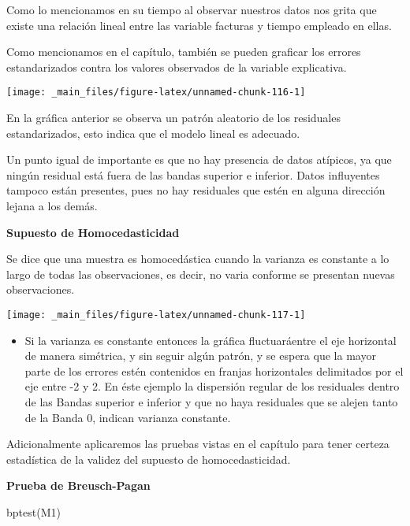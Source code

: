 \documentclass[
  a4paper,
  oneside,
  openany]{book}
\newenvironment{Shaded}{\begin{snugshade}}{\end{snugshade}}
\newcommand{\FunctionTok}[1]{\textcolor[rgb]{0.00,0.00,0.00}{#1}}
\newcommand{\NormalTok}[1]{#1}
\providecommand{\tightlist}{%
  \setlength{\itemsep}{0pt}\setlength{\parskip}{0pt}}
\begin{document}
Como lo mencionamos en su tiempo al observar nuestros datos nos grita que existe una relación lineal entre las variable facturas y tiempo empleado en ellas.

Como mencionamos en el capítulo, también se pueden graficar los errores estandarizados contra los valores observados de la variable explicativa.

\begin{center}\texttt{[image: \_main\_files/figure-latex/unnamed-chunk-116-1]} \end{center}

En la gráfica anterior se observa un patrón aleatorio de los residuales estandarizados, esto indica que el modelo lineal es adecuado.

Un punto igual de importante es que no hay presencia de datos atípicos, ya que ningún residual está fuera de las bandas superior e inferior. Datos influyentes tampoco están presentes, pues no hay residuales que estén en alguna dirección lejana a los demás.

\textbf{Supuesto de Homocedasticidad}

Se dice que una muestra es homocedástica cuando la varianza es constante a lo largo de todas las observaciones, es decir, no varia conforme se presentan nuevas observaciones.

\begin{center}\texttt{[image: \_main\_files/figure-latex/unnamed-chunk-117-1]} \end{center}

\begin{itemize}
\tightlist
\item
  Si la varianza es constante entonces la gráfica fluctuaráentre el eje horizontal de manera simétrica, y sin seguir algún patrón, y se espera que la mayor parte de los errores estén contenidos en franjas horizontales delimitados por el eje entre -2 y 2. En éste ejemplo la dispersión regular de los residuales dentro de las Bandas superior e inferior y que no haya residuales que se alejen tanto de la Banda 0, indican varianza constante.
\end{itemize}

Adicionalmente aplicaremos las pruebas vistas en el capítulo para tener certeza estadística de la validez del supuesto de homocedasticidad.

\textbf{Prueba de Breusch-Pagan}

\begin{Shaded}
\begin{Highlighting}[]
\FunctionTok{bptest}\NormalTok{(M1)}
\end{Highlighting}
\end{Shaded}
\end{document}
